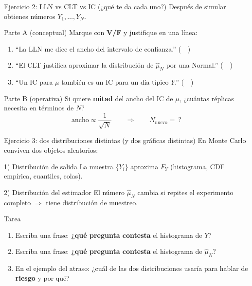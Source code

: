\documentclass[aspectratio=1610, 9pt]{beamer}
\begin{document}
\begin{frame}{Ejercicio 2: LLN vs CLT vs IC (¿qué te da cada uno?)}
\small
Después de simular obtienes números $Y_1,\dots,Y_N$.

\begin{block}{Parte A (conceptual)}
Marque con \textbf{V/F} y justifique en una línea:
\begin{enumerate}
\item ``La LLN me dice el ancho del intervalo de confianza.'' \hfill (\ \ )
\item ``El CLT justifica aproximar la distribución de $\widehat\mu_N$ por una Normal.'' \hfill (\ \ )
\item ``Un IC para $\mu$ también es un IC para un día típico $Y$.'' \hfill (\ \ )
\end{enumerate}
\end{block}

\begin{block}{Parte B (operativa)}
Si quiere \textbf{mitad} del ancho del IC de $\mu$, ¿cuántas réplicas necesita en términos de $N$?
\[
\text{ancho} \propto \frac{1}{\sqrt{N}} \qquad \Rightarrow \qquad N_{\text{nuevo}}=\ ? 
\]
\end{block}
\end{frame}


\begin{frame}{Ejercicio 3: dos distribuciones distintas (y dos gráficas distintas)}
\small
En Monte Carlo conviven dos objetos aleatorios:

\begin{block}{1) Distribución de salida}
La muestra $\{Y_i\}$ aproxima $F_Y$ (histograma, CDF empírica, cuantiles, colas).
\end{block}

\begin{block}{2) Distribución del estimador}
El número $\widehat\mu_N$ cambia si repites el experimento completo $\Rightarrow$ tiene distribución de muestreo.
\end{block}

\begin{block}{Tarea}
\begin{enumerate}
\item Escriba una frase: \textbf{¿qué pregunta contesta} el histograma de $Y$?
\item Escriba una frase: \textbf{¿qué pregunta contesta} el histograma de $\widehat\mu_N$?
\item En el ejemplo del atraso: ¿cuál de las dos distribuciones usaría para hablar de \textbf{riesgo} y por qué?
\end{enumerate}
\end{block}
\end{frame}
\end{document}
